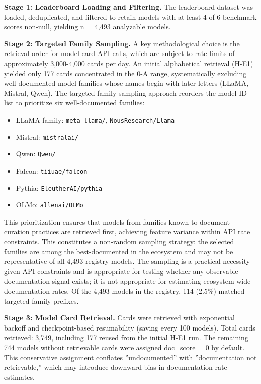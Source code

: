 \textbf{Stage 1: Leaderboard Loading and Filtering.} The leaderboard dataset was loaded, deduplicated, and filtered to retain models with at least 4 of 6 benchmark scores non-null, yielding n = 4,493 analyzable models.

\textbf{Stage 2: Targeted Family Sampling.} A key methodological choice is the retrieval order for model card API calls, which are subject to rate limits of approximately 3,000-4,000 cards per day. An initial alphabetical retrieval (H-E1) yielded only 177 cards concentrated in the 0-A range, systematically excluding well-documented model families whose names begin with later letters (LLaMA, Mistral, Qwen). The targeted family sampling approach reorders the model ID list to prioritize six well-documented families:

\begin{itemize}
\item LLaMA family: \texttt{meta-llama/}, \texttt{NousResearch/Llama}
\item Mistral: \texttt{mistralai/}
\item Qwen: \texttt{Qwen/}
\item Falcon: \texttt{tiiuae/falcon}
\item Pythia: \texttt{EleutherAI/pythia}
\item OLMo: \texttt{allenai/OLMo}
\end{itemize}

This prioritization ensures that models from families known to document curation practices are retrieved first, achieving feature variance within API rate constraints. This constitutes a non-random sampling strategy: the selected families are among the best-documented in the ecosystem and may not be representative of all 4,493 registry models. The sampling is a practical necessity given API constraints and is appropriate for testing whether any observable documentation signal exists; it is not appropriate for estimating ecosystem-wide documentation rates. Of the 4,493 models in the registry, 114 (2.5\%) matched targeted family prefixes.

\textbf{Stage 3: Model Card Retrieval.} Cards were retrieved with exponential backoff and checkpoint-based resumability (saving every 100 models). Total cards retrieved: 3,749, including 177 reused from the initial H-E1 run. The remaining 744 models without retrievable cards were assigned doc\_score = 0 by default. This conservative assignment conflates ''undocumented'' with ''documentation not retrievable,'' which may introduce downward bias in documentation rate estimates.

